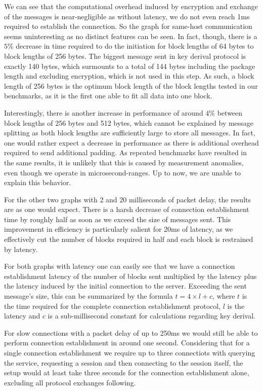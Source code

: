 We can see that the computational overhead induced by encryption and exchange of the messages is near-negligible as without latency, we do not even reach 1ms required to establish the connection.
So the graph for same-host communication seems uninteresting as no distinct features can be seen.
In fact, though, there is a $5\%$ decrease in time required to do the initiation for block lengths of 64 bytes to block lengths of 256 bytes.
The biggest message sent in key derival protocol is exactly 140 bytes, which surmounts to a total of 144 bytes including the package length and excluding encryption, which is not used in this step.
As such, a block length of 256 bytes is the optimum block length of the block lengths tested in our benchmarks, as it is the first one able to fit all data into one block.

Interestingly, there is another increase in performance of around $4\%$ between block lengths of 256 bytes and 512 bytes, which cannot be explained by message splitting as both block lengths are sufficiently large to store all messages.
In fact, one would rather expect a decrease in performance as there is additional overhead required to send additional padding.
As repeated benchmarks have resulted in the same results, it is unlikely that this is caused by measurement anomalies, even though we operate in microsecond-ranges.
Up to now, we are unable to explain this behavior.

For the other two graphs with 2 and 20 milliseconds of packet delay, the results are as one would expect.
There is a harsh decrease of connection establishment time by roughly half as soon as we exceed the size of messages sent.
This improvement in efficiency is particularly salient for 20ms of latency, as we effectively cut the number of blocks required in half and each block is restrained by latency.

For both graphs with latency one can easily see that we have a connection establishment latency of the number of blocks sent multiplied by the latency plus the latency induced by the initial connection to the server.
Exceeding the sent message's size, this can be summarized by the formula $t = 4 \times l + c$, where $t$ is the time required for the complete connection establishment protocol, $l$ is the latency and $c$ is a sub-millisecond constant for calculations regarding key derival.

For slow connections with a packet delay of up to 250ms we would still be able to perform connection establishment in around one second.
Considering that for a single connection establishment we require up to three connectiots with querying the service, requesting a session and then connecting to the session itself, the setup would at least take three seconds for the connection establishment alone, excluding all protocol exchanges following.

